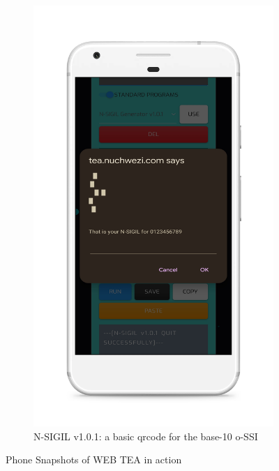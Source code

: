 \documentclass[a4paper, 18pt]{book} %
\begin{document}
\begin{figure}[H]
  \hfill
  \begin{subfigure}[b]{0.45\textwidth}
    \includegraphics[width=\textwidth]{resources/images/nsigil_ossi.png}
    \caption{N-SIGIL v1.0.1: a basic qrcode for the base-10 o-SSI}
    \label{FIGNSIGIL2}
  \end{subfigure}
  \caption{Phone Snapshots of WEB TEA in action}
  \label{FIGNSIGILDEMO}
\end{figure}
\end{document}

